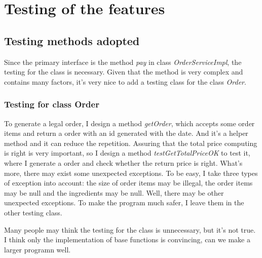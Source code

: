 \documentclass[a4paper]{report}
\begin{document}
\chapter{Testing of the features}
\section{Testing methods adopted}
Since the primary interface is the method \emph{pay} in class \emph{OrderServiceImpl}, the testing for the class is necessary. Given that the method is very complex and contains many factors, it's very nice to add a testing class for the class \emph{Order}.
\subsection {Testing for class Order}
\par To generate a legal order, I design a method \emph{getOrder}, which accepts some order items and return a order with an id generated with the date. And it's a helper method and it can reduce the repetition. Assuring that the total price computing is right is very important, so I design a method \emph{testGetTotalPriceOK} to test it, where I generate a order and check whether the return price is right. What's more, there may exist some unexpected exceptions. To be easy, I take three types of exception into account: the size of order items may be illegal, the order items may be null and the ingredients may be null. Well, there may be other unexpected exceptions. To make the  program much safer, I leave them in the other testing class. 
\par Many people may think the testing for the class is unnecessary, but it's not true. I think only the implementation of base functions is convincing, can we make a larger programn well.
\end{document}
